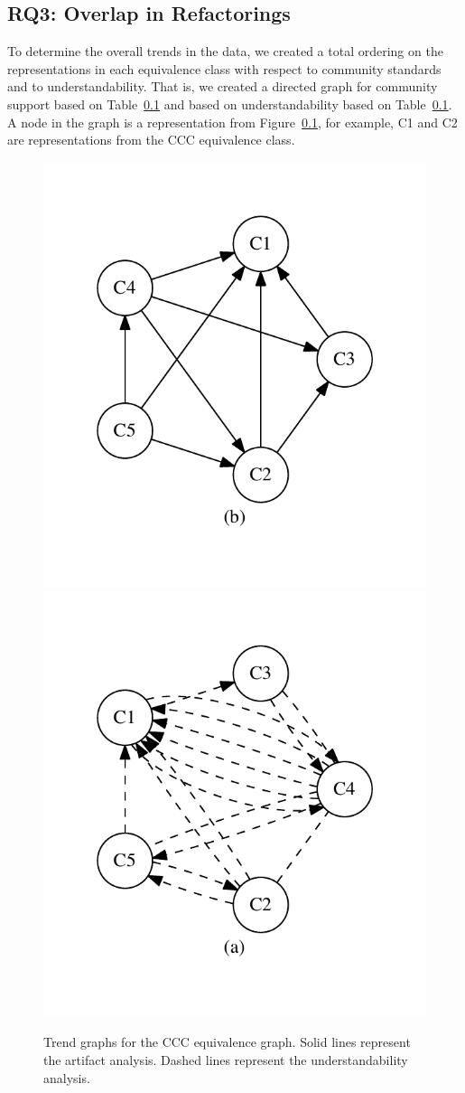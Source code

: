 





\subsection{RQ3: Overlap in Refactorings}

To determine the overall trends in the data, we created a total ordering on the representations in each equivalence class  with respect to community standards and to understandability. That is, we created a directed graph for community support based on Table~\ref{} and based on understandability based on Table~\ref{}. A node in the graph is a representation from Figure~\ref{}, for example, C1 and C2 are representations from the CCC equivalence class. 

\begin{figure}[tb]
\centering
\includegraphics[width=0.42\columnwidth]{graphs/cart.pdf}\includegraphics[width=0.57\columnwidth]{graphs/ccom.pdf}
\caption{Trend graphs for the CCC equivalence graph. Solid lines represent the artifact analysis. Dashed lines represent the understandability analysis.}
\label{fig:graphsforanalysis}
\end{figure}

